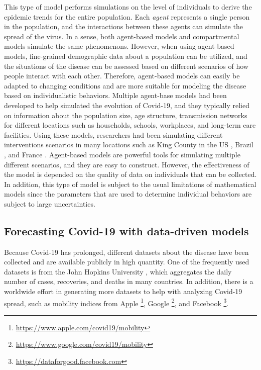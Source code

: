This type of model performs simulations on the level of individuals to derive the epidemic trends for the entire population.
Each \textit{agent} represents a single person in the population, and the interactions between these agents can simulate the spread of the virus.
In a sense, both agent-based models and compartmental models simulate the same phenomenons.
However, when using agent-based models, fine-grained demographic data about a population can be utilized, and the situations of the disease can be assessed based on different scenarios of how people interact with each other.
Therefore, agent-based models can easily be adapted to changing conditions and are more suitable for modeling the disease based on individualistic behaviors.
Multiple agent-base models had been developed to help simulated the evolution of Covid-19, and they typically relied on information about the population size, age structure, transmission networks for different locations such as households, schools, workplaces, and long-term care facilities.
Using these models, researchers had been simulating different interventions scenarios in many locations such as King County in the \gls{US} \cite{kerrCovasimAgentbasedModel2021}, Brazil \cite{silvaCOVIDABSAgentbasedModel2020}, and France \cite{hoertelStochasticAgentbasedModel2020}.
Agent-based models are powerful tools for simulating multiple different scenarios, and they are easy to construct.
However, the effectiveness of the model is depended on the quality of data on individuals that can be collected.
In addition, this type of model is subject to the usual limitations of mathematical models since the parameters that are used to determine individual behaviors are subject to large uncertainties.

\subsection{Forecasting Covid-19 with data-driven models}

Because Covid-19 has prolonged, different datasets about the disease have been collected and are available publicly in high quantity.
One of the frequently used datasets is from the John Hopkins University \cite{dongInteractiveWebbasedDashboard2020}, which aggregates the daily number of cases, recoveries, and deaths in many countries.
In addition, there is a worldwide effort in generating more datasets to help with analyzing Covid-19 spread, such as mobility indices from Apple \footnote{\url{https://www.apple.com/covid19/mobility}}, Google \footnote{\url{https://www.google.com/covid19/mobility}}, and Facebook \footnote{\url{https://dataforgood.facebook.com}}.

